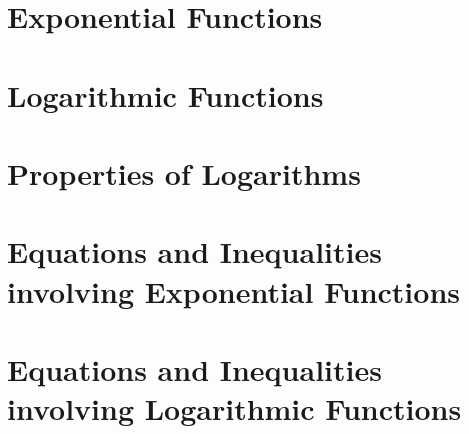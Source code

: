 \section{Exponential Functions}



\newpage

\section{Logarithmic Functions}



\newpage

\section{Properties of Logarithms}



\newpage

\section{Equations and Inequalities involving Exponential Functions}



\newpage

\section{Equations and Inequalities involving Logarithmic Functions}



\begin{comment}
\newpage

\section{Applications of Exponential and Logarithmic Functions}


\end{comment}
